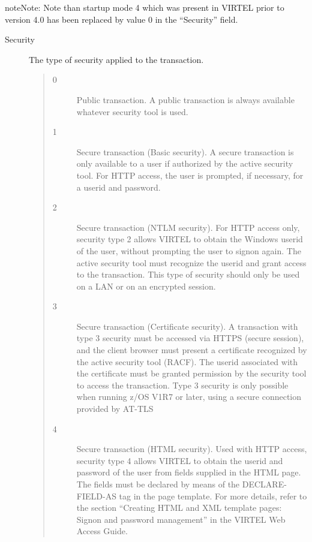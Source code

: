 \documentclass[letterpaper,10pt,english]{sphinxmanual}
\begin{document}
\begin{sphinxadmonition}{note}{Note:}
Note than startup mode 4 which was present in VIRTEL prior to version 4.0 has been replaced by value 0 in the “Security” field.
\end{sphinxadmonition}
\begin{description}
\item[{Security}] \leavevmode
The type of security applied to the transaction.
\begin{quote}
\begin{description}
\item[{0}] \leavevmode
Public transaction. A public transaction is always available whatever security tool is used.

\item[{1}] \leavevmode
Secure transaction (Basic security). A secure transaction is only available to a user if authorized by the active security tool. For HTTP access, the user is prompted, if necessary, for a userid and password.

\item[{2}] \leavevmode
Secure transaction (NTLM security). For HTTP access only, security type 2 allows VIRTEL to obtain the Windows userid of the user, without prompting the user to signon again. The active security tool must recognize the userid and grant access to the transaction. This type of security should only be used on a LAN or on an encrypted session.

\item[{3}] \leavevmode
Secure transaction (Certificate security). A transaction with type 3 security must be accessed via HTTPS (secure session), and the client browser must present a certificate recognized by the active security tool (RACF). The userid associated with the certificate must be granted permission by the security tool to access the transaction. Type 3 security is only possible when running z/OS V1R7 or later, using a secure connection provided by AT-TLS

\item[{4}] \leavevmode
Secure transaction (HTML security). Used with HTTP access, security type 4 allows VIRTEL to obtain the userid and password of the user from fields supplied in the HTML page. The fields must be declared by means of the DECLARE-FIELD-AS tag in the page template. For more details, refer to the section “Creating HTML and XML template pages: Signon and password management” in the VIRTEL Web Access Guide.

\end{description}
\end{quote}


\end{description}
\end{document}
